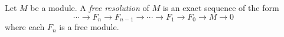 \documentclass[12pt]{article}
\begin{document}
Let $M$ be a module.  A {\it free resolution} of $M$
is an exact sequence of the form
$$\cdots \to F_n \to F_{n-1} \to \cdots \to F_1 \to F_0 \to M \to 0$$
where each $F_n$ is a free module.
\end{document}
